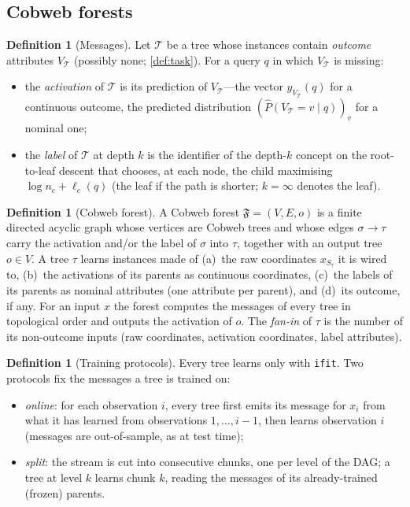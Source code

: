 \documentclass[11pt]{article}
\theoremstyle{definition}
\newtheorem{definition}[theorem]{Definition}
\theoremstyle{remark}
\newcommand{\T}{\mathcal{T}}
\newcommand{\F}{\mathfrak{F}}
\newcommand{\hy}{\hat{y}}
\begin{document}
\subsection{Cobweb forests}

\begin{definition}[Messages]\label{def:messages}
Let $\T$ be a tree whose instances contain \emph{outcome} attributes $V_\T$ (possibly
none; \cref{def:task}).  For a query $q$ in which $V_\T$ is missing:
\begin{itemize}[leftmargin=*]
\item the \emph{activation} of $\T$ is its prediction of $V_\T$---the vector
  $\hy_{V_\T}(q)$ for a continuous outcome, the predicted distribution
  $(\hat P(V_\T{=}v\mid q))_v$ for a nominal one;
\item the \emph{label} of $\T$ at depth $k$ is the identifier of the depth-$k$ concept
  on the root-to-leaf descent that chooses, at each node, the child maximising
  $\log n_c+\ell_c(q)$ (the leaf if the path is shorter; $k=\infty$ denotes the leaf).
\end{itemize}
\end{definition}

\begin{definition}[Cobweb forest]\label{def:forest}
A Cobweb forest $\F=(V,E,o)$ is a finite directed acyclic graph whose vertices are
Cobweb trees and whose edges $\sigma\to\tau$ carry the activation and/or the label of
$\sigma$ into $\tau$, together with an output tree $o\in V$.  A tree $\tau$ learns
instances made of (a)~the raw coordinates $x_{S_\tau}$ it is wired to, (b)~the activations
of its parents as continuous coordinates, (c)~the labels of its parents as nominal
attributes (one attribute per parent), and (d)~its outcome, if any.  For an input $x$
the forest computes the messages of every tree in topological order and outputs the
activation of $o$.  The \emph{fan-in} of $\tau$ is the number of its non-outcome inputs
(raw coordinates, activation coordinates, label attributes).
\end{definition}

\begin{definition}[Training protocols]\label{def:forestlearn}
Every tree learns only with \texttt{ifit}.  Two protocols fix the messages a tree is
trained on:
\begin{itemize}[leftmargin=*]
\item \emph{online}: for each observation $i$, every tree first emits its message for
  $x_i$ from what it has learned from observations $1,\dots,i-1$, then learns
  observation $i$ (messages are out-of-sample, as at test time);
\item \emph{split}: the stream is cut into consecutive chunks, one per level of the DAG;
  a tree at level $k$ learns chunk $k$, reading the messages of its already-trained
  (frozen) parents.
\end{itemize}
\end{definition}
\end{document}
